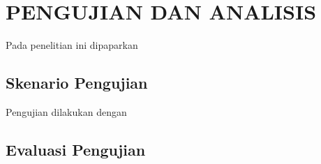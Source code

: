 \chapter{PENGUJIAN DAN ANALISIS}
\label{chap:pengujiananalisis}


Pada penelitian ini dipaparkan \lipsum[1][1-5]

\section{Skenario Pengujian}
\label{sec:skenariopengujian}

Pengujian dilakukan dengan \lipsum[1-2]

\section{Evaluasi Pengujian}
\label{sec:analisispengujian}

\lipsum[1]

%
%
%
%
%
%
%


